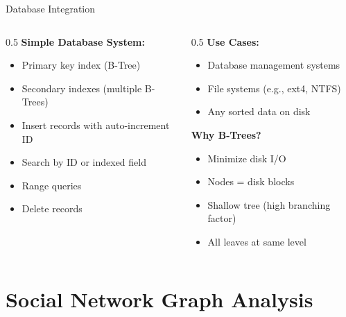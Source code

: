 \documentclass[aspectratio=169,xcolor=dvipsnames]{beamer}
\begin{document}
\begin{frame}{Database Integration}
  \begin{columns}
    \begin{column}{0.5\textwidth}
      \textbf{Simple Database System:}
      \begin{itemize}
        \item Primary key index (B-Tree)
        \item Secondary indexes (multiple B-Trees)
        \item Insert records with auto-increment ID
        \item Search by ID or indexed field
        \item Range queries
        \item Delete records
      \end{itemize}
    \end{column}

    \begin{column}{0.5\textwidth}
      \textbf{Use Cases:}
      \begin{itemize}
        \item Database management systems
        \item File systems (e.g., ext4, NTFS)
        \item Any sorted data on disk
      \end{itemize}

      \vspace{0.3cm}
      \textbf{Why B-Trees?}
      \begin{itemize}
        \item Minimize disk I/O
        \item Nodes = disk blocks
        \item Shallow tree (high branching factor)
        \item All leaves at same level
      \end{itemize}
    \end{column}
  \end{columns}
\end{frame}

\section{Social Network Graph Analysis}
\end{document}
